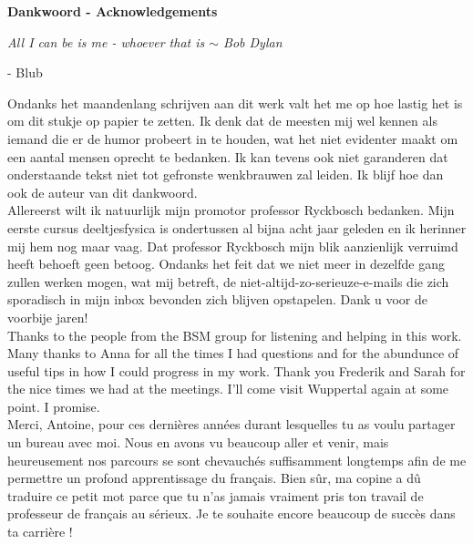 \clearpage
\thispagestyle{empty}

\begin{huge}
\textbf{Dankwoord - Acknowledgements}\\
\end{huge}
\begin{flushright}
\textit{All I can be is me - whoever that is $\sim$ Bob Dylan
\\}
\end{flushright}

- Blub

\iffalse
\noindent Ondanks het maandenlang schrijven aan dit werk valt het me op hoe lastig het is om dit stukje op papier te zetten. Ik denk dat de meesten mij wel kennen als iemand die er de humor probeert in te houden, wat het niet evidenter maakt om een aantal mensen oprecht te bedanken. Ik kan tevens ook niet garanderen dat onderstaande tekst niet tot gefronste wenkbrauwen zal leiden. Ik blijf hoe dan ook de auteur van dit dankwoord.\\

\noindent Allereerst wilt ik natuurlijk mijn promotor professor Ryckbosch bedanken. Mijn eerste cursus deeltjesfysica is ondertussen al bijna acht jaar geleden en ik herinner mij hem nog maar vaag. Dat professor Ryckbosch mijn blik aanzienlijk verruimd heeft behoeft geen betoog. Ondanks het feit dat we niet meer in dezelfde gang zullen werken mogen, wat mij betreft, de niet-altijd-zo-serieuze-e-mails die zich sporadisch in mijn inbox bevonden zich blijven opstapelen. Dank u voor de voorbije jaren!\\

\noindent Thanks to the people from the BSM group for listening and helping in this work. Many thanks to Anna for all the times I had questions and for the abundunce of useful tips in how I could progress in my work. Thank you Frederik and Sarah for the nice times we had at the meetings. I'll come visit Wuppertal again at some point. I promise.\\

\noindent Merci, Antoine, pour ces dernières années durant lesquelles tu as voulu partager un bureau avec moi. Nous en avons vu beaucoup aller et venir, mais heureusement nos parcours se sont chevauchés suffisamment longtemps afin de me permettre un profond apprentissage du français. Bien sûr, ma copine a dû traduire ce petit mot parce que tu n'as jamais vraiment pris ton travail de professeur de français au sérieux. Je te souhaite encore beaucoup de succès dans ta carrière !\\

